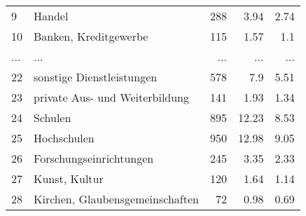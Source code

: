 \begin{longtable}{lXrrr}
        9 & \multicolumn{1}{X}{Handel} & %
          \num{288} &
          \num[round-mode=places,round-precision=2]{3.94} &
          \num[round-mode=places,round-precision=2]{2.74} \\
        10 & \multicolumn{1}{X}{Banken, Kreditgewerbe} & %
          \num{115} &
          \num[round-mode=places,round-precision=2]{1.57} &
          \num[round-mode=places,round-precision=2]{1.1} \\
       ... & ... & ... & ... & ... \\
        22 & \multicolumn{1}{X}{sonstige Dienstleistungen} & %
          \num{578} &
          \num[round-mode=places,round-precision=2]{7.9} &
          \num[round-mode=places,round-precision=2]{5.51} \\

        23 & \multicolumn{1}{X}{private Aus- und Weiterbildung} & %
          \num{141} &
          \num[round-mode=places,round-precision=2]{1.93} &
          \num[round-mode=places,round-precision=2]{1.34} \\

        24 & \multicolumn{1}{X}{Schulen} & %
          \num{895} &
          \num[round-mode=places,round-precision=2]{12.23} &
          \num[round-mode=places,round-precision=2]{8.53} \\

        25 & \multicolumn{1}{X}{Hochschulen} & %
          \num{950} &
          \num[round-mode=places,round-precision=2]{12.98} &
          \num[round-mode=places,round-precision=2]{9.05} \\

        26 & \multicolumn{1}{X}{Forschungseinrichtungen} & %
          \num{245} &
          \num[round-mode=places,round-precision=2]{3.35} &
          \num[round-mode=places,round-precision=2]{2.33} \\

        27 & \multicolumn{1}{X}{Kunst, Kultur} & %
          \num{120} &
          \num[round-mode=places,round-precision=2]{1.64} &
          \num[round-mode=places,round-precision=2]{1.14} \\

        28 & \multicolumn{1}{X}{Kirchen, Glaubensgemeinschaften} & %
          \num{72} &
          \num[round-mode=places,round-precision=2]{0.98} &
          \num[round-mode=places,round-precision=2]{0.69} \\


\end{longtable}
